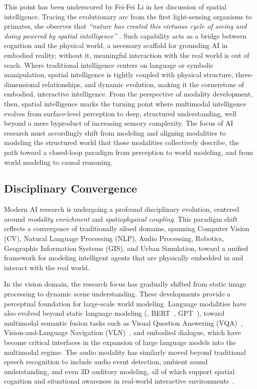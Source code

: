 This point has been underscored by Fei-Fei Li in her discussion of spatial intelligence. Tracing the evolutionary arc from the first light-sensing organisms to primates, she observes that \emph{``nature has created this virtuous cycle of seeing and doing powered by spatial intelligence''} \cite{Feifei2024ted}.
Such capability acts as a bridge between cognition and the physical world, a necessary scaffold for grounding AI in embodied reality; without it, meaningful interaction with the real world is out of reach.
Where traditional intelligence centers on language or symbolic manipulation, spatial intelligence is tightly coupled with physical structure, three-dimensional relationships, and dynamic evolution, making it the cornerstone of embodied, interactive intelligence.
From the perspective of modality development, then, spatial intelligence marks the turning point where multimodal intelligence evolves from surface-level perception to deep, structured understanding, well beyond a mere byproduct of increasing sensory complexity.
The focus of AI research must accordingly shift from modeling and aligning modalities to modeling the structured world that those modalities collectively describe, the path toward a closed-loop paradigm from perception to world modeling, and from world modeling to causal reasoning.







\subsection{Disciplinary Convergence}
\label{subsec:disciplinary-convergence}

Modern AI research is undergoing a profound disciplinary evolution, centered around \textit{modality enrichment} and \textit{spatiophysical coupling}. 
This paradigm shift reflects a convergence of traditionally siloed domains, spanning Computer Vision (CV), Natural Language Processing (NLP), Audio Processing, Robotics, Geographic Information Systems (GIS), and Urban Simulation, toward a unified framework for modeling intelligent agents that are physically embedded in and interact with the real world.


In the vision domain, the research focus has gradually shifted from static image processing to dynamic scene understanding. 
These developments provide a perceptual foundation for large-scale world modeling. 
Language modalities have also evolved beyond static language modeling (\eg, BERT~\cite{devlin2019bert}, GPT~\cite{brown2020language}), toward multimodal semantic fusion tasks such as Visual Question Answering (VQA)~\cite{antol2015vqa}, Vision-and-Language Navigation (VLN)~\cite{gu2022vision}, and embodied dialogue, which have become critical interfaces in the expansion of large language models into the multimodal regime. 
The audio modality has similarly moved beyond traditional speech recognition to include audio event detection, ambient sound understanding, and even 3D auditory modeling, all of which support spatial cognition and situational awareness in real-world interactive environments~\cite{chen2020soundspaces,chen2022soundspaces}.


